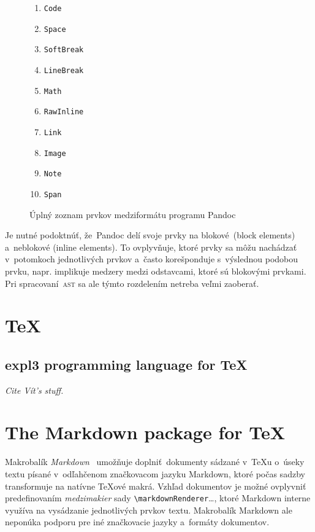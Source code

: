 \documentclass[
  digital,     %
  oneside,     %
  nosansbold,  %
  nocolorbold, %
  lof,         %
  lot,         %
]{fithesis4}
\newcommand{\macro}[1]{\texttt{\textbackslash{}{#1}}}
\begin{document}
\begin{figure}
\begin{multicols}{2}
\begin{enumerate}
      \item \texttt{Code}
      \item \texttt{Space}
      \item \texttt{SoftBreak}
      \item \texttt{LineBreak}
      \item \texttt{Math}
      \item \texttt{RawInline}
      \item \texttt{Link}
      \item \texttt{Image}
      \item \texttt{Note}
      \item \texttt{Span}
    \end{enumerate}
  \end{multicols}
  \vspace*{-1em}
  \caption{Úplný zoznam prvkov medziformátu programu Pandoc}
  \label{fig:pandoc-elems}
\end{figure}

Je nutné podoktnúť, že Pandoc delí svoje prvky na blokové (block elements) a~neblokové (inline elements). To ovplyvňuje, ktoré prvky sa môžu nachádzať v~potomkoch jednotlivých prvkov a~často korešponduje s~výslednou podobou prvku, napr. implikuje medzery medzi odstavcami, ktoré sú blokovými prvkami. Pri spracovaní \textsc{ast} sa ale týmto rozdelením netreba veľmi zaoberať.

\section{\TeX{}}
\subsection{expl3 programming language for \TeX{}}
\emph{Cite Vít's stuff.}

\section{The Markdown package for \TeX{}}
Makrobalík \emph{Markdown}~\cite{cstug-markdown} umožňuje doplniť dokumenty sádzané v~\TeX{}u o~úseky textu písané v~odľahčenom značkovacom jazyku Markdown, ktoré počas sadzby transformuje na natívne \TeX{}ové makrá. Vzhľad dokumentov je možné ovplyvniť predefinovaním \emph{medzimakier} sady \macro{markdownRenderer}\ldots, ktoré Markdown interne využíva na vysádzanie jednotlivých prvkov textu.
Makrobalík Markdown ale neponúka podporu pre iné značkovacie jazyky a~formáty dokumentov.
\end{document}
